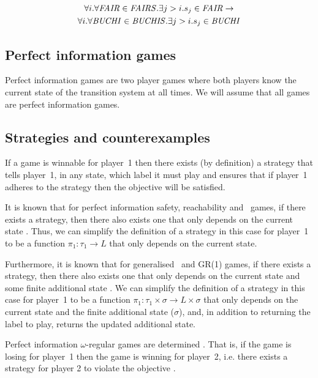 \begin{multline}
\forall i. \forall \mathit{FAIR} \in \mathit{FAIRS}. \exists j>i. s_j \in \mathit{FAIR} \rightarrow \\ \forall i. \forall \mathit{BUCHI} \in \mathit{BUCHIS}. \exists j>i. s_j \in \mathit{BUCHI}
\end{multline}

\subsection{Perfect information games}

Perfect information games are two player games where both players know the current state of the transition system at all times. We will assume that all games are perfect information games.

\subsection{Strategies and counterexamples}
\label{sec:strat_and_cex}

If a game is winnable for player~1 then there exists (by definition) a strategy that tells player~1, in any state, which label it must play and ensures that if player~1 adheres to the strategy then the objective will be satisfied.

It is known that for perfect information safety, reachability and \buchi\ games, if there exists a strategy, then there also exists one that only depends on the current state \cite{something}. Thus, we can simplify the definition of a strategy in this case for player~1 to be a function $\pi_1 : \tau_1 \rightarrow L$ that only depends on the current state.

Furthermore, it is known that for generalised \buchi\ and GR(1) games, if there exists a strategy, then there also exists one that only depends on the current state and some finite additional state \cite{something}. We can simplify the definition of a strategy in this case for player~1 to be a function $\pi_1 : \tau_1 \times \sigma \rightarrow L \times \sigma$ that only depends on the current state and the finite additional state ($\sigma$), and, in addition to returning the label to play, returns the updated additional state.

Perfect information $\omega$-regular games are determined . That is, if the game is losing for player~1 then the game is winning for player~2, i.e. there exists a strategy for player 2 to violate the objective \cite{something}.

